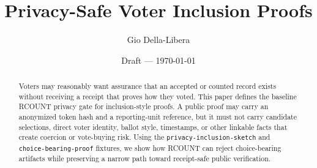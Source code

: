 \documentclass[12pt]{article}
\title{Privacy-Safe Voter Inclusion Proofs}
\author{Gio Della-Libera}
\date{Draft --- \today}
\begin{document}
\maketitle

\begin{abstract}
Voters may reasonably want assurance that an accepted or counted record exists
without receiving a receipt that proves how they voted. This paper defines the
baseline RCOUNT privacy gate for inclusion-style proofs. A public proof may
carry an anonymized token hash and a reporting-unit reference, but it must not
carry candidate selections, direct voter identity, ballot style, timestamps, or
other linkable facts that create coercion or vote-buying risk. Using the
\texttt{privacy-inclusion-sketch} and \texttt{choice-bearing-proof} fixtures, we
show how RCOUNT can reject choice-bearing artifacts while preserving a narrow
path toward receipt-safe public verification.
\end{abstract}









\nocite{rcount-overview-2026,rcount-hashing-2026,rcount-substrate-2026}


\end{document}
